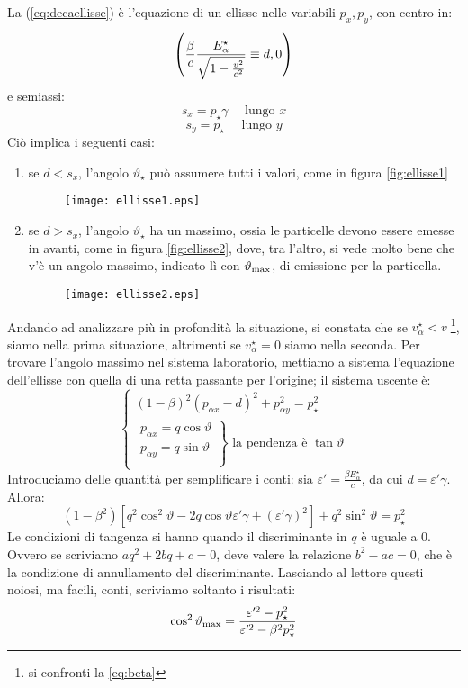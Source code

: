 La (\ref{eq:decaellisse}) \`e l'equazione di un ellisse nelle
variabili $p_x,p_y$, con centro in:
$$
\left(\frac{\beta}{c}\frac{E_{\alpha}^{\star}}{\sqrt{1-\frac{v^{2}}{c^{2}}}}\equiv
d,0\right)
$$
e semiassi:
$$
s_x=p_{\star}\gamma\quad\mbox{ lungo }x
$$
$$
s_y=p_{\star}\quad\mbox{ lungo }y
$$
Ci\`o implica i seguenti casi:
\begin{enumerate}
\item se $d<s_x$, l'angolo $\vartheta_{\star}$ pu\`o assumere
tutti i valori, come in f\mbox{}igura \vref{fig:ellisse1}

\begin{figure}[htbp]
\begin{center}
\texttt{[image: ellisse1.eps]}
\caption{ } \label{fig:ellisse1}
\end{center}
\end{figure}

\item se $d>s_x$, l'angolo $\vartheta_{\star}$ ha un massimo,
ossia le particelle devono essere emesse in avanti, come in
f\mbox{}igura \vref{fig:ellisse2}, dove, tra l'altro, si vede
molto bene che v'\`e un angolo massimo, indicato l\`i con
$\vartheta_{\mathrm{max}}$, di emissione per la particella.

\begin{figure}[htbp]
\begin{center}
\texttt{[image: ellisse2.eps]}
\caption{ } \label{fig:ellisse2}
\end{center}
\end{figure}
\end{enumerate}
Andando ad analizzare pi\`u in profondit\`a la situazione, si
constata che se $v_{\alpha}^{\star}<v\;$\footnote{si confronti la
\ref{eq:beta}}, siamo nella prima situazione, altrimenti se
$v_{\alpha}^{\star}=0$ siamo nella seconda. \newline Per trovare
l'angolo massimo nel sistema laboratorio, mettiamo a sistema
l'equazione dell'ellisse con quella di una retta passante per
l'origine; il sistema uscente \`e:
$$
\left\{\begin{array}{l} (1-\beta)^2(p_{\alpha x}-d)^2+p^2_{\alpha
y}=p_{\star}^2\\
\left.\begin{array}{l}
p_{\alpha x}=q\cos\vartheta\\
p_{\alpha y}=q\sin\vartheta\\
\end{array}\right\}\mbox{ la pendenza \`e }\tan\vartheta\end{array}\right.
$$
Introduciamo delle quantit\`a per semplif\mbox{}icare i conti: sia
$\varepsilon'=\frac{\beta E^{\star}_{\alpha}}{c}$, da cui
$d=\varepsilon'\gamma$. Allora:
$$
(1-\beta^2)[q^2\cos^2\vartheta-2q\cos\vartheta\varepsilon'\gamma +
(\varepsilon'\gamma)^2] + q^2\sin^2\vartheta
 = p^2_{\star}
$$
Le condizioni di tangenza si hanno quando il discriminante in $q$
\`e uguale a 0. Ovvero se scriviamo $aq^2+2bq+c=0$, deve valere la
relazione $b^2-ac=0$, che \`e la condizione di annullamento del
discriminante. Lasciando al lettore questi noiosi, ma facili,
conti, scriviamo soltanto i risultati:
$$
\cos^2\vartheta_{\mathrm{max}}=\frac{\varepsilon'^2-p_{\star}^2}{\varepsilon'^2-
\beta^2 
p_{\star}^2}
$$

